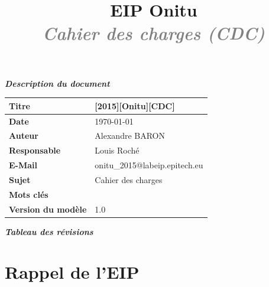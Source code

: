 \documentclass[12pt]{report}
\title{
	\huge{\textbf{\textcolor{epiBlue}{EIP Onitu} } }\\
	\Large{\textbf{\emph{\textcolor{gray}{Cahier des charges (CDC)} } } }
}
\newcommand{\rowstyle}[1]{\gdef\currentrowstyle{#1}%
  #1\ignorespaces
}
\newcommand{\DocTitle}{[2015][Onitu][CDC]}
\begin{document}
\maketitle



\thispagestyle{empty}
\vspace*{10mm}
\textbf{\emph{\textcolor{epiBlue}{Description du document} } }\\

\begin{tabular}{|>{\columncolor[gray]{0.85}\color{epiBlue} \bfseries } l|l|}
\hline
	Titre & \DocTitle\\
\hline
	Date & \dashDate\today \\
\hline
	Auteur & Alexandre BARON\\
\hline
	Responsable & Louis Roché\\
\hline
	E-Mail & onitu\_2015@labeip.epitech.eu\\
\hline
	Sujet & Cahier des charges\\
\hline
	Mots clés & \\
\hline
	Version du modèle & 1.0\\
\hline
\end{tabular}
\vspace*{10mm}

\textbf{\emph{\textcolor{epiBlue}{Tableau des révisions} } }\\



\tableofcontents
{}
\thispagestyle{empty}

\chapter{Rappel de l'EIP}
\thispagestyle{EIP} %
\setcounter{page}{1} %
\end{document}

